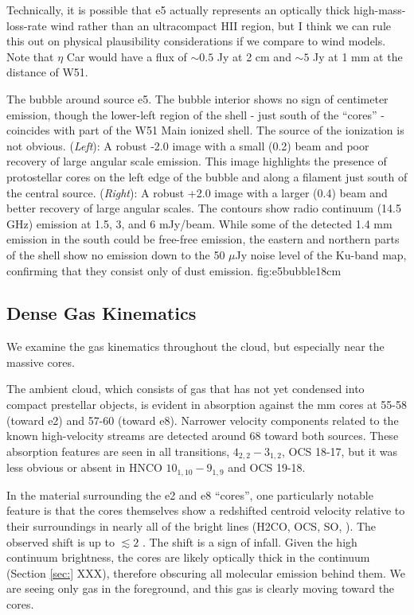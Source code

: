 \documentclass{aa}
\begin{document}
Technically, it is possible that e5 actually represents an optically thick
high-mass-loss-rate wind rather than an ultracompact HII region, but I think we
can rule this out on physical plausibility considerations if we compare to 
wind models.  Note that $\eta$ Car would have a flux of $\sim0.5$ Jy at 2 cm
and $\sim5$ Jy at 1 mm at the distance of W51.

{The bubble around source e5.  The bubble interior shows no sign of centimeter
emission, though the lower-left region of the shell - just south of the
``cores'' - coincides with part of the W51 Main ionized shell.  The source of
the ionization is not obvious.
({\it Left}): A robust -2.0 image with a small (0.2\arcsec) beam and poor
recovery of large angular scale emission.  This image highlights the presence
of protostellar cores on the left edge of the bubble and along a filament just
south of the central source.
({\it Right}): A robust +2.0 image with a larger (0.4\arcsec) beam and better
recovery of large angular scales.  The contours show radio continuum (14.5 GHz)
emission at 1.5, 3, and 6 mJy/beam.  While some of the detected 1.4 mm emission
in the south could be free-free emission, the eastern and northern parts of the
shell show no emission down to the 50 $\mu$Jy noise level of the Ku-band map,
confirming that they consist only of dust emission.
}{fig:e5bubble}{1}{8cm}




\subsection{Dense Gas Kinematics}
\label{sec:kinematics}
We examine the gas kinematics throughout the cloud, but especially near the 
massive cores.

The ambient cloud, which consists of gas that has not yet condensed into
compact prestellar objects, is evident in absorption against the mm cores at
55-58 \kms (toward e2) and 57-60 \kms (toward e8).  Narrower velocity
components related to the known high-velocity streams are detected around 68
\kms toward both sources.  These absorption features are seen in all 
\formaldehyde transitions, \methanol $4_{2,2}-3_{1,2}$, OCS 18-17,
but it was less obvious or absent in HNCO $10_{1,10}-9_{1,9}$ and OCS 19-18.

In the material surrounding the e2 and e8 ``cores'', one particularly notable
feature is that the cores themselves show a redshifted centroid velocity
relative to their surroundings in nearly all of the bright lines (H2CO, OCS,
SO, \ceighteeno).  The observed shift is up to $\lesssim2$ \kms.  The shift is
a sign of infall.  Given the high continuum brightness, the cores are likely
optically thick in the continuum (Section \ref{sec:} XXX), therefore obscuring
all molecular emission behind them.  We are seeing only gas in the
foreground, and this gas is clearly moving toward the cores.
\end{document}
